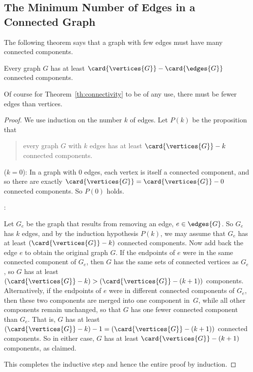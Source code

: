 \subsection{The Minimum Number of Edges in a Connected Graph}

The following theorem says that a graph with few edges must have many
connected components.
\begin{theorem}\label{th:connectivity}
Every graph $G$ has at least $\card{\vertices{G}} - \card{\edges{G}}$
connected components.
\end{theorem}
Of course for Theorem~\ref{th:connectivity} to be of any use, there must
be fewer edges than vertices.

\begin{proof}
We use induction on the number $k$ of edges.  Let $P(k)$ be the
proposition that
\begin{quote}
every graph $G$ with $k$ edges has at least $\card{\vertices{G}}-k$
connected components.
\end{quote}

 ($k=0$): In a graph with 0 edges, each
vertex is itself a connected component, and so there are exactly
$\card{\vertices{G}} = \card{\vertices{G}} - 0$ connected components.
So $P(0)$ holds.

:

\iffalse
Now we assume that the induction hypothesis holds for every $k$-edge
graph in order to prove that it holds for every $(k+1)$-edge graph,
where $k \geq 0$.
\fi

Let $G_e$ be the graph that results from removing an edge, $e \in
\edges{G}$.  So $G_e$ has $k$ edges, and by the induction hypothesis
$P(k)$, we may assume that $G_e$ has at least $(\card{\vertices{G}} -
k)$ connected components.  Now add back the edge $e$ to obtain the
original graph $G$.  If the endpoints of $e$ were in the same
connected component of $G_e$, then $G$ has the same sets of connected
vertices as $G_e$, so $G$ has at least $(\card{\vertices{G}} - k) >
(\card{\vertices{G}} - (k+1))$ components.  Alternatively, if the
endpoints of $e$ were in different connected components of $G_e$, then
these two components are merged into one component in~$G$, while all
other components remain unchanged, so that $G$ has one fewer connected
component than $G_e$.  That is, $G$ has at least $(\card{\vertices{G}}
- k) - 1 = (\card{\vertices{G}} - (k+1))$ connected components.  So in
either case, $G$ has at least $\card{\vertices{G}} - (k+1)$
components, as claimed.

This completes the inductive step and hence the entire proof by
induction.
\end{proof}

